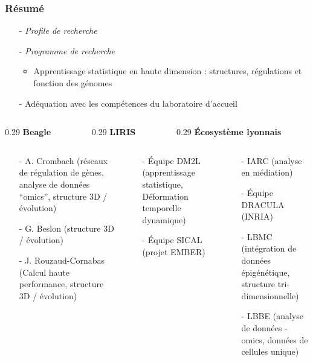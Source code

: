 \documentclass[11pt,xcolor=dvipsnames]{beamer}
\begin{document}
\begin{frame}
\frametitle{Résumé}
\begin{itemize}
\small
\item[-] {\em Profile de recherche}
\item[-] {\em Programme de recherche} \\
\begin{itemize}
\item Apprentissage statistique en haute dimension : structures,
régulations et fonction des génomes
\end{itemize}
\item[-] Adéquation avec les compétences du laboratoire d'accueil
\end{itemize}

\begin{columns}
\begin{column}
{0.29\linewidth}
\tiny
{\bf Beagle}
\end{column}
\begin{column}
{0.29\linewidth}
\tiny
{\bf LIRIS}
\end{column}
\begin{column}
{0.29\linewidth}
\tiny
{\bf Écosystème lyonnais}
\end{column}

\end{columns}
\begin{columns}
\tiny
\begin{column}{0.29\linewidth}
\begin{itemize}[leftmargin=*]
\item[-] A. Crombach (réseaux de régulation de gènes, analyse de données ``omics'',
structure 3D / évolution)
\item[-] G. Beslon (structure 3D / évolution)
\item[-] J. Rouzaud-Cornabas (Calcul haute performance, structure
3D / évolution)
\end{itemize}
\end{column}

\begin{column}{0.29\linewidth}
\begin{itemize}[leftmargin=*]
\item[-] Équipe DM2L (apprentissage statistique, Déformation temporelle
dynamique)  
\item[-] Équipe SICAL (projet EMBER)
\end{itemize}
\end{column}

\begin{column}{0.29\linewidth}
\begin{itemize}[leftmargin=*]
\item[-] IARC (analyse en médiation)
\item[-] Équipe DRACULA (INRIA)
\item[-] LBMC (intégration de données épigénétique, structure tri-dimensionnelle)
\item[-] LBBE (analyse de données -omics, données de cellules unique)
\end{itemize}
\end{column}
\end{columns}


\end{frame}
\end{document}
